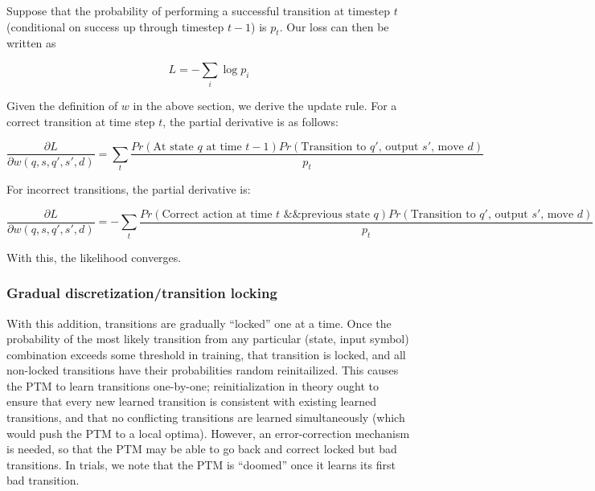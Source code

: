 \documentclass{article}
\begin{document}
Suppose that the probability of performing a successful transition at timestep $t$ (conditional on success up through timestep $t-1$) is $p_t$. Our loss can then be written as

\[ L = -\sum_i \log{p_i} \]

Given the definition of $w$ in the above section, we derive the update rule. For a correct transition at time step $t$, the partial derivative is as follows:

\[ \frac{\partial L}{\partial w(q, s, q', s', d)} = \sum_t \frac{Pr(\text{At state $q$ at time $t-1$})Pr(\text{Transition to $q'$, output $s'$, move $d$})}{p_t} \]

For incorrect transitions, the partial derivative is:

\[ \frac{\partial L}{\partial w(q, s, q', s', d)} = -\sum_t \frac{Pr(\text{Correct action at time $t$ \&\& previous state $q$})Pr(\text{Transition to $q'$, output $s'$, move $d$})}{p_t} \]

With this, the likelihood converges.

\subsubsection{Gradual discretization/transition locking}
With this addition, transitions are gradually ``locked'' one at a time. Once the probability of the most likely transition from any particular (state, input symbol) combination exceeds some threshold in training, that transition is locked, and all non-locked transitions have their probabilities random reinitailized. This causes the PTM to learn transitions one-by-one; reinitialization in theory ought to ensure that every new learned transition is consistent with existing learned transitions, and that no conflicting transitions are learned simultaneously (which would push the PTM to a local optima). However, an error-correction mechanism is needed, so that the PTM may be able to go back and correct locked but bad transitions. In trials, we note that the PTM is ``doomed'' once it learns its first bad transition.
\end{document}
